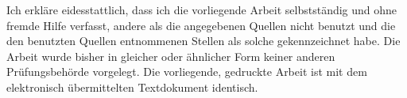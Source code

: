 \thispagestyle{empty}
\pagebreak
\hspace{0pt}
\vfill
Ich erkläre eidesstattlich, dass ich die vorliegende Arbeit selbstständig und ohne fremde
Hilfe verfasst, andere als die angegebenen Quellen nicht benutzt und die den benutzten
Quellen entnommenen Stellen als solche gekennzeichnet habe. Die Arbeit wurde bisher in
gleicher oder ähnlicher Form keiner anderen Prüfungsbehörde vorgelegt. Die vorliegende,
gedruckte Arbeit ist mit dem elektronisch übermittelten Textdokument identisch.
\vfill
\hspace{0pt}
\pagebreak
